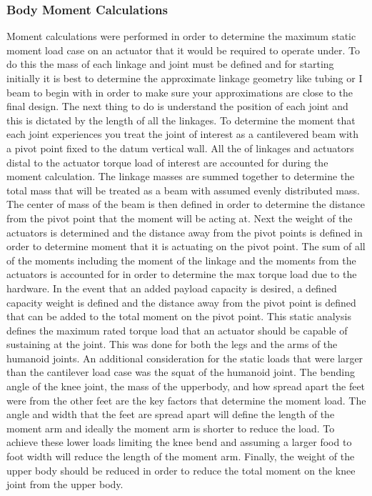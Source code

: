 \documentclass{article}
\begin{document}

\subsubsection{Body Moment Calculations}

Moment calculations were performed in order to determine the maximum static moment load case on an actuator that it would be required to operate under. To do this the mass of each linkage and joint must be defined and for starting initially it is best to determine the approximate linkage geometry like tubing or I beam to begin with in order to make sure your approximations are close to the final design. The next thing to do is understand the position of each joint and this is dictated by the length of all the linkages. To determine the moment that each joint experiences you treat the joint of interest as a cantilevered beam with a pivot point fixed to the datum vertical wall. All the of linkages and actuators distal to the actuator torque load of interest are accounted for during the moment calculation. The linkage masses are summed together to determine the total mass that will be treated as a beam with assumed evenly distributed mass. The center of mass of the beam is then defined in order to determine the distance from the pivot point that the moment will be acting at. Next the weight of the actuators is determined and the distance away from the pivot points is defined in order to determine moment that it is actuating on the pivot point. The sum of all of the moments including the moment of the linkage and the moments from the actuators is accounted for in order to determine the max torque load due to the hardware. In the event that an added payload capacity is desired, a defined capacity weight is defined and the distance away from the pivot point is defined that can be added to the total moment on the pivot point. This static analysis defines the maximum rated torque load that an actuator should be capable of sustaining at the joint. This was done for both the legs and the arms of the humanoid joints. 
An additional consideration for the static loads that were larger than the cantilever load case was the squat of the humanoid joint. The bending angle of the knee joint, the mass of the upperbody, and how spread apart the feet were from the other feet are the key factors that determine the moment load. The angle and width that the feet are spread apart will define the length of the moment arm and ideally the moment arm is shorter to reduce the load. To achieve these lower loads limiting the knee bend and assuming a larger food to foot width will reduce the length of the moment arm. Finally, the weight of the upper body should be reduced in order to reduce the total moment on the knee joint from the upper body. 
\end{document}
